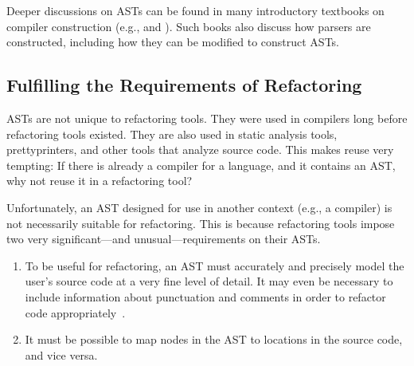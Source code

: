 \documentclass[prodmode]{acmlarge}
\begin{document}
Deeper discussions on ASTs can be found in many introductory textbooks on
compiler construction (e.g., \cite{aho06compilers} and
\cite{torczon11engineering}).  Such books also discuss how parsers are
constructed, including how they can be modified to construct ASTs.

\FloatBarrier

\subsection{Fulfilling the Requirements of Refactoring}
\label{ss:reqs}


ASTs are not unique to refactoring tools.  They were used in compilers long
before refactoring tools existed.  They are also used in static analysis tools,
prettyprinters, and other tools that analyze source code.  This makes reuse
very tempting: If there is already a compiler for a language, and it contains
an AST, why not reuse it in a refactoring tool?

Unfortunately, an AST designed for use in another context (e.g., a compiler) is
not necessarily suitable for refactoring.  This is because refactoring tools
impose two very significant---and unusual---requirements on their ASTs.

\begin{enumerate}
\item To be useful for refactoring, an AST must accurately and precisely model
the user's source code at a very fine level of detail.  It may even be
necessary to include information about punctuation and comments in order to
refactor code appropriately~\cite{sommerlad08retaining}.
\item It must be possible to map nodes in the AST to locations in the
source code, and vice versa.
\end{enumerate}
\end{document}
